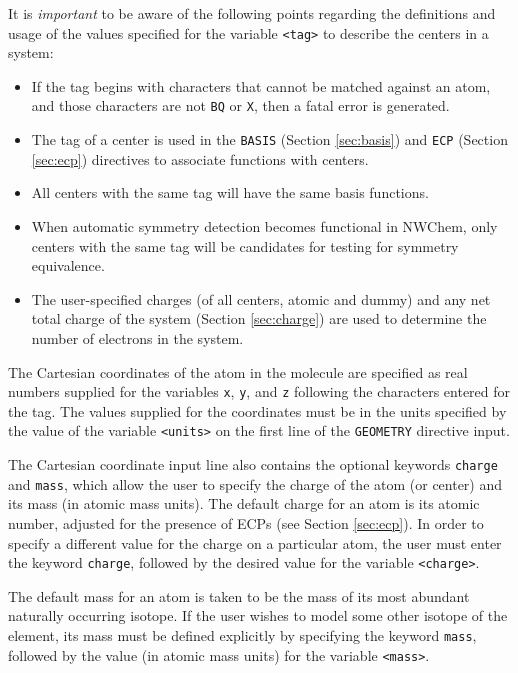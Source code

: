 It is {\em important} to be aware of the following points regarding
the definitions and usage of the values specified for the variable
\verb+<tag>+ to describe the centers in a system:
\begin{itemize}
\item If the tag begins with characters that cannot be matched against
  an atom, and those characters are not \verb+BQ+ or \verb+X+, then a
  fatal error is generated.
\item The tag of a center is used in the \verb+BASIS+ (Section
  \ref{sec:basis}) and \verb+ECP+ (Section \ref{sec:ecp}) directives
  to associate functions with centers.
\item All centers with the same tag will have the same basis
  functions.
\item When automatic symmetry detection becomes functional in NWChem,
  only centers with the same tag will be candidates for testing for
  symmetry equivalence.
\item The user-specified charges (of all centers, atomic and dummy)
  and any net total charge of the system (Section \ref{sec:charge})
  are used to determine the number of electrons in the system.
\end{itemize}

The Cartesian coordinates of the atom in the molecule are specified as
real numbers supplied for the variables \verb+x+, \verb+y+, and
\verb+z+ following the characters entered for the tag.  The values
supplied for the coordinates must be in the units specified by the
value of the variable \verb+<units>+ on the first line of the
\verb+GEOMETRY+ directive input.

The Cartesian coordinate input line also contains the optional
keywords \verb+charge+ and \verb+mass+, which allow the user to
specify the charge of the atom (or center) and its mass (in atomic
mass units).  The default charge for an atom is its atomic number,
adjusted for the presence of ECPs (see Section \ref{sec:ecp}).  In
order to specify a different value for the charge on a particular
atom, the user must enter the keyword \verb+charge+, followed by the
desired value for the variable \verb+<charge>+.

The default mass for an atom is taken to be the mass of its most
abundant naturally occurring isotope.  If the user wishes to model
some other isotope of the element, its mass must be defined explicitly
by specifying the keyword \verb+mass+, followed by the value (in
atomic mass units) for the variable \verb+<mass>+.

